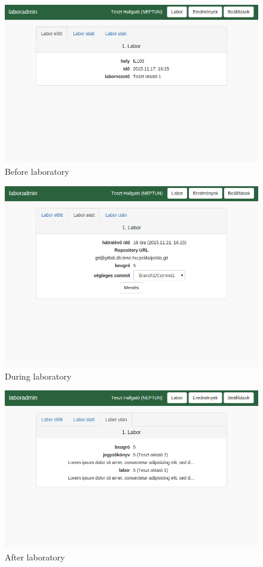 \begin{figure}[!ht]
	\includegraphics[width=\textwidth]{figures/design/labor_elott.png}
	\caption{Before laboratory}
	\label{fig:before}
\end{figure}

\begin{figure}[!ht]
	\includegraphics[width=\textwidth]{figures/design/labor_alatt.png}
	\caption{During laboratory}
	\label{fig:during}
\end{figure}

\begin{figure}[!ht]
	\includegraphics[width=\textwidth]{figures/design/labor_utan.png}
	\caption{After laboratory}
	\label{fig:after}
\end{figure}

